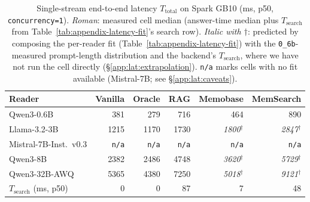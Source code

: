 \begin{table}[!htbp]
\centering
\small
\caption{Single-stream end-to-end latency $T_{\text{total}}$ on Spark GB10 (ms, p50, \texttt{concurrency=1}). \emph{Roman}: measured cell median (answer-time median plus $T_{\text{search}}$ from Table~\ref{tab:appendix-latency-fit}'s search row). \emph{Italic with $\dagger$}: predicted by composing the per-reader fit (Table~\ref{tab:appendix-latency-fit}) with the \texttt{0\_6b}-measured prompt-length distribution and the backend's $T_{\text{search}}$, where we have not run the cell directly (\S\ref{app:lat:extrapolation}). \texttt{n/a} marks cells with no fit available (Mistral-7B; see \S\ref{app:lat:caveats}).}
\label{tab:appendix-latency-predicted}
\begin{tabular}{lrrrrr}
\toprule
Reader & Vanilla & Oracle & RAG & Memobase & MemSearch \\
\midrule
Qwen3-0.6B & 381 & 279 & 716 & 464 & 890 \\
Llama-3.2-3B & 1215 & 1170 & 1730 & \textit{1800}$^\dagger$ & \textit{2847}$^\dagger$ \\
Mistral-7B-Inst.\ v0.3 & \texttt{n/a} & \texttt{n/a} & \texttt{n/a} & \texttt{n/a} & \texttt{n/a} \\
Qwen3-8B & 2382 & 2486 & 4748 & \textit{3620}$^\dagger$ & \textit{5729}$^\dagger$ \\
Qwen3-32B-AWQ & 5365 & 4380 & 7250 & \textit{5018}$^\dagger$ & \textit{9121}$^\dagger$ \\
\midrule
$T_{\text{search}}$ (ms, p50) & 0 & 0 & 87 & 7 & 48 \\
\bottomrule
\end{tabular}
\end{table}
